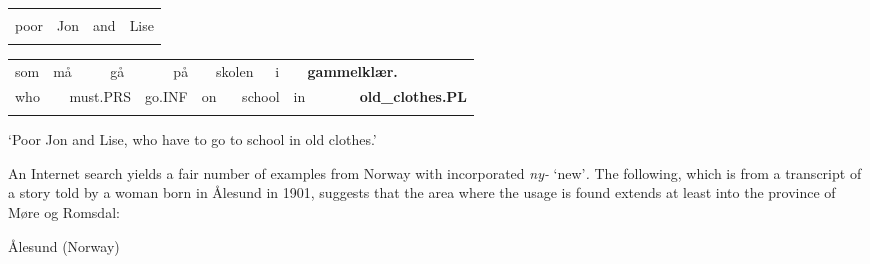 \begin{tabular}{llll}
\lsptoprule
\multicolumn{4}{l}{Stakkars

}\\
poor & Jon & and & Lise\\
\lspbottomrule
\end{tabular}

\begin{tabular}{llllllllllllll}
\lsptoprule
som & \multicolumn{2}{l}{må

} & \multicolumn{2}{l}{gå

} & \multicolumn{2}{l}{på

} & \multicolumn{2}{l}{skolen

} & \multicolumn{2}{l}{i

} & \multicolumn{2}{l}{{\bfseries gammelklær.}

} & \\
\multicolumn{2}{l}{who

} & \multicolumn{2}{l}{must.PRS

} & \multicolumn{2}{l}{go.INF

} & \multicolumn{2}{l}{on

} & \multicolumn{2}{l}{school

} & \multicolumn{2}{l}{in

} & \multicolumn{2}{l}{{\bfseries old\_clothes.PL}

}\\
\lspbottomrule
\end{tabular}

\begin{styleTranslation}
‘Poor Jon and Lise, who have to go to school in old clothes.’

\end{styleTranslation}

\begin{styleBodyTextFirst}
An Internet search yields a fair number of examples from Norway with incorporated \textit{ny-} ‘new’\textit{. }The following, which is from a transcript of a story told by a woman born in Ålesund in 1901, suggests that the area where the usage is found extends at least into the province of Møre og Romsdal:

\end{styleBodyTextFirst}

\begin{listWWNumileveli}
\item {}

\begin{styleExample}
Ålesund (Norway)

\end{styleExample}

\end{listWWNumileveli}

